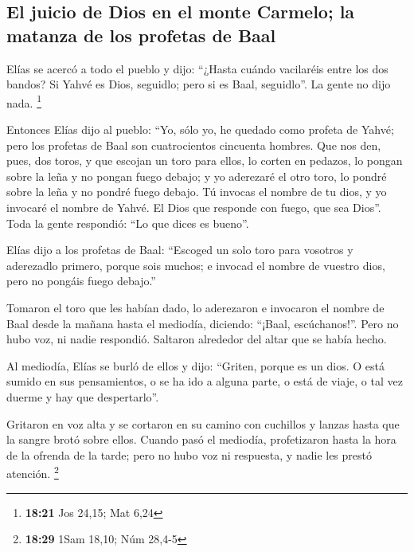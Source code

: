 \begin{paracol}{2}
\hypertarget{el-juicio-de-dios-en-el-monte-carmelo-la-matanza-de-los-profetas-de-baal}{%
\subsection{El juicio de Dios en el monte Carmelo; la matanza de los
profetas de
Baal}\label{el-juicio-de-dios-en-el-monte-carmelo-la-matanza-de-los-profetas-de-baal}}

 Elías se acercó a todo el pueblo y dijo: ``¿Hasta cuándo
vacilaréis entre los dos bandos? Si Yahvé es Dios, seguidlo; pero si es
Baal, seguidlo''. La gente no dijo nada. \footnote{\textbf{18:21} Jos
  24,15; Mat 6,24}

 Entonces Elías dijo al pueblo: ``Yo, sólo yo, he quedado
como profeta de Yahvé; pero los profetas de Baal son cuatrocientos
cincuenta hombres.  Que nos den, pues, dos toros, y que
escojan un toro para ellos, lo corten en pedazos, lo pongan sobre la
leña y no pongan fuego debajo; y yo aderezaré el otro toro, lo pondré
sobre la leña y no pondré fuego debajo.  Tú invocas el
nombre de tu dios, y yo invocaré el nombre de Yahvé. El Dios que
responde con fuego, que sea Dios''. Toda la gente respondió: ``Lo que
dices es bueno''.

 Elías dijo a los profetas de Baal: ``Escoged un solo
toro para vosotros y aderezadlo primero, porque sois muchos; e invocad
el nombre de vuestro dios, pero no pongáis fuego debajo.''

 Tomaron el toro que les habían dado, lo aderezaron e
invocaron el nombre de Baal desde la mañana hasta el mediodía, diciendo:
``¡Baal, escúchanos!''. Pero no hubo voz, ni nadie respondió. Saltaron
alrededor del altar que se había hecho.

 Al mediodía, Elías se burló de ellos y dijo: ``Griten,
porque es un dios. O está sumido en sus pensamientos, o se ha ido a
alguna parte, o está de viaje, o tal vez duerme y hay que despertarlo''.

 Gritaron en voz alta y se cortaron en su camino con
cuchillos y lanzas hasta que la sangre brotó sobre ellos.
 Cuando pasó el mediodía, profetizaron hasta la hora de
la ofrenda de la tarde; pero no hubo voz ni respuesta, y nadie les
prestó atención. \footnote{\textbf{18:29} 1Sam 18,10; Núm 28,4-5}


\end{paracol}
